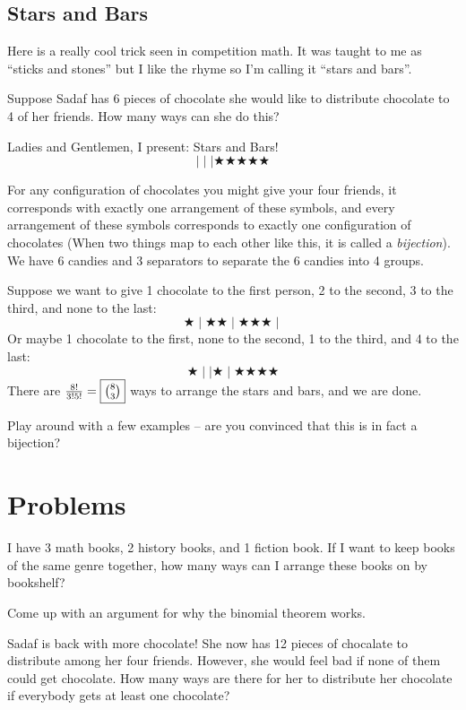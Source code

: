 \documentclass{scrartcl}
\begin{document}
	\subsection{Stars and Bars}
	Here is a really cool trick seen in competition math. It was taught to me as ``sticks and stones'' but I like the rhyme so I'm calling it ``stars and bars''.
	\begin{example}
		Suppose Sadaf has 6 pieces of chocolate she would like to distribute chocolate to 4 of her friends. How many ways can she do this?
	\end{example}
	\begin{soln}
		Ladies and Gentlemen, I present: Stars and Bars!
		\[\mid\mid\mid\bigstar\bigstar\bigstar\bigstar\bigstar\]

		For any configuration of chocolates you might give your four friends, it corresponds with exactly one arrangement of these symbols, and every arrangement of these symbols corresponds to exactly one configuration of chocolates (When two things map to each other like this, it is called a \emph{bijection}). We have 6 candies and 3 separators to separate the 6 candies into 4 groups.
		
		Suppose we want to give 1 chocolate to the first person, 2 to the second, 3 to the third, and none to the last:
		\[\bigstar\mid\bigstar\bigstar\mid\bigstar\bigstar\bigstar\mid\]
		Or maybe 1 chocolate to the first, none to the second, 1 to the third, and 4 to the last:
		\[\bigstar\mid\mid\bigstar\mid\bigstar\bigstar\bigstar\bigstar\]
		There are $\frac{8!}{3!5!} = \boxed{\tbinom{8}{3}}$ ways to arrange the stars and bars, and we are done.
	\end{soln}

	\begin{exercise}
		Play around with a few examples -- are you convinced that this is in fact a bijection?
	\end{exercise}

	\section{Problems}
	\begin{problem} I have 3 math books, 2 history books, and 1 fiction book. If I want to keep books of the same genre together, how many ways can I arrange these books on by bookshelf?
	\end{problem}
	\begin{problem}
		Come up with an argument for why the binomial theorem works.
	\end{problem}
	\begin{problem}
		Sadaf is back with more chocolate! She now has 12 pieces of chocalate to distribute among her four friends. However, she would feel bad if none of them could get chocolate. How many ways are there for her to distribute her chocolate if everybody gets at least one chocolate?
	\end{problem}
\end{document}
